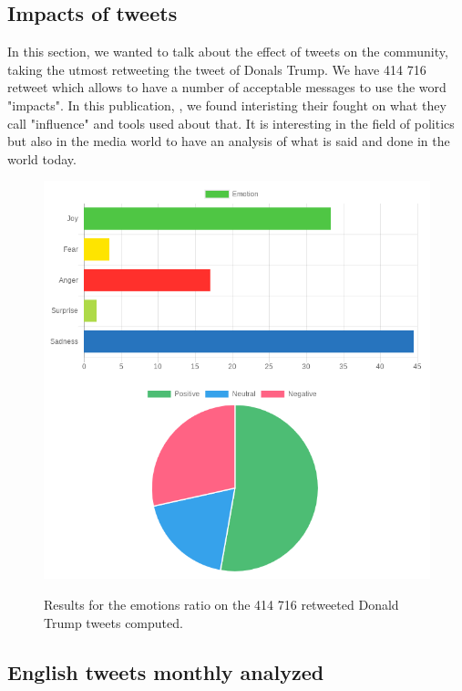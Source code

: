 \documentclass{acmtog} %
\begin{document}
\begin{itemize}
\subsection{Impacts of tweets}
\label{subsub:impacts_tweets}

In this section, we wanted to talk about the effect of tweets on the community, taking the utmost retweeting the tweet of Donals Trump. We have 414 716 retweet which allows to have a number of acceptable messages to use the word "impacts". In this publication, \cite{Vyas17}, we found interisting their fought on what they call "influence" and tools used about that. It is interesting in the field of politics but also in the media world to have an analysis of what is said and done in the world today.


\begin{figure}[H]
{\includegraphics[width=\linewidth]{retweeted_emotion_sentiment_trump-exemple.png}}
\caption{Results for the emotions ratio on the 414 716 retweeted Donald Trump tweets computed.}
  \label{fig:trump_results}
\end{figure}

\subsection{English tweets monthly analyzed}
\label{subsub:english_tweets_monthly}


\end{itemize}
\end{document}
